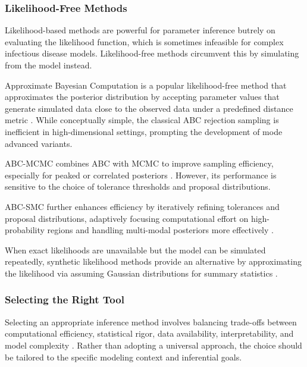 \documentclass{article}
\begin{document}
\subsubsection{Likelihood-Free Methods}

Likelihood-based methods are powerful for parameter inference butrely on evaluating the likelihood function, which is sometimes infeasible for complex infectious disease models. Likelihood-free methods circumvent this by simulating from the model instead.

Approximate Bayesian Computation is a popular likelihood-free method that approximates the posterior distribution by accepting parameter values that generate simulated data close to the observed data under a predefined distance metric \citep{rubin1984bayesianly, tavare1997inferring, beaumont2002approximate}. While conceptually simple, the classical ABC rejection sampling is inefficient in high-dimensional settings, prompting the development of mode advanced variants. 

ABC-MCMC combines ABC with MCMC to improve sampling efficiency, especially for peaked or correlated posteriors \citep{marjoram2003markov, wegmann2009efficient, kypraios2017tutorial}. However, its performance is sensitive to the choice of tolerance thresholds and proposal distributions.

ABC-SMC further enhances efficiency by iteratively refining  tolerances and proposal distributions, adaptively focusing computational effort on high-probability regions and handling multi-modal posteriors more effectively \citep{sisson2007sequential, toni2009approximate, beaumont2009adaptive, drovandi2011likelihood}. 

When exact likelihoods are unavailable but the model can be simulated repeatedly, synthetic likelihood methods provide an alternative by approximating the likelihood via assuming Gaussian distributions for summary statistics \citep{wood2010statistical, price2018bayesian}. 

\subsubsection{Selecting the Right Tool}

Selecting an appropriate inference method involves balancing trade-offs between computational efficiency, statistical rigor, data availability, interpretability, and model complexity \citep{funk2020choices}. Rather than adopting a universal approach, the choice should be tailored to the specific modeling context and inferential goals. 
\end{document}
